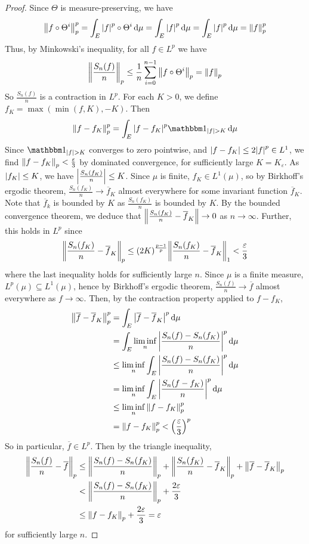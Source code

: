 \begin{proof}
	Since \( \Theta \) is measure-preserving, we have
	\[ \norm{f \circ \Theta^i}_p^p = \int_E \abs{f}^p \circ \Theta^i \dd{\mu} = \int_E \abs{f}^p \dd{\mu} = \int_E \abs{f}^p \dd{\mu} = \norm{f}_p^p \]
	Thus, by Minkowski's inequality, for all \( f \in L^p \) we have
	\[ \norm{\frac{S_n(f)}{n}}_p \leq \frac{1}{n} \sum_{i=0}^{n-1} \norm{f \circ \Theta^i}_p = \norm{f}_p \]
	So \( \frac{S_n(f)}{n} \) is a contraction in \( L^p \).
	For each \( K > 0 \), we define \( f_K = \max(\min(f, K), -K) \).
	Then
	\[ \norm{f - f_K}_p^p = \int_E \abs{f - f_K}^p \mathbbm 1_{\abs{f} > K} \dd{\mu} \]
	Since \( \mathbbm 1_{\abs{f} > K} \) converges to zero pointwise, and \( \abs{f - f_K} \leq 2\abs{f}^p \in L^1 \), we find \( \norm{f - f_K}_p < \frac{\varepsilon}{3} \) by dominated convergence, for sufficiently large \( K = K_\varepsilon \).
	As \( \abs{f_K} \leq K \), we have \( \abs{\frac{S_n(f_K)}{n}} \leq K \).
	Since \( \mu \) is finite, \( f_K \in L^1(\mu) \), so by Birkhoff's ergodic theorem, \( \frac{S_n(f_K)}{n} \to \overline f_K \) almost everywhere for some invariant function \( \overline f_K \).
	Note that \( \overline f_k \) is bounded by \( K \) as \( \frac{S_n(f_K)}{n} \) is bounded by \( K \).
	By the bounded convergence theorem, we deduce that \( \norm{\frac{S_n(f_K)}{n} - \overline f_K} \to 0 \) as \( n \to \infty \).
	Further, this holds in \( L^p \) since
	\[ \norm{\frac{S_n(f_K)}{n} - \overline f_K}_p \leq (2K)^{\frac{p-1}{p}} \norm{\frac{S_n(f_K)}{n} - \overline f_K}_1 < \frac{\varepsilon}{3} \]
	where the last inequality holds for sufficiently large \( n \).
	Since \( \mu \) is a finite measure, \( L^p(\mu) \subseteq L^1(\mu) \), hence by Birkhoff's ergodic theorem, \( \frac{S_n(f)}{n} \to \overline f \) almost everywhere as \( f \to \infty \).
	Then, by the contraction property applied to \( f - f_K \),
	\begin{align*}
		\norm{\overline f - \overline f_K}_p^p &= \int_E \abs{\overline f - \overline f_K}^p \dd{\mu} \\
		&= \int_E \liminf_n \abs{\frac{S_n(f) - S_n(f_K)}{n}}^p \dd{\mu} \\
		&\leq \liminf_n \int_E \abs{\frac{S_n(f) - S_n(f_K)}{n}}^p \dd{\mu} \\
		&= \liminf_n \int_E \abs{\frac{S_n(f - f_K)}{n}}^p \dd{\mu} \\
		&\leq \liminf_n \norm{f - f_K}_p^p \\
		&= \norm{f - f_K}_p^p < \qty(\frac{\varepsilon}{3})^p
	\end{align*}
	So in particular, \( \overline f \in L^p \).
	Then by the triangle inequality,
	\begin{align*}
			\norm{\frac{S_n(f)}{n} - \overline f}_p &\leq \norm{\frac{S_n(f) - S_n(f_K)}{n}}_p + \norm{\frac{S_n(f_K)}{n} - \overline f_K}_p + \norm{\overline f - \overline f_K}_p \\
			&< \norm{\frac{S_n(f) - S_n(f_K)}{n}}_p + \frac{2\varepsilon}{3} \\
			&\leq \norm{f - f_K}_p + \frac{2\varepsilon}{3} = \varepsilon
	\end{align*}
	for sufficiently large \( n \).
\end{proof}

